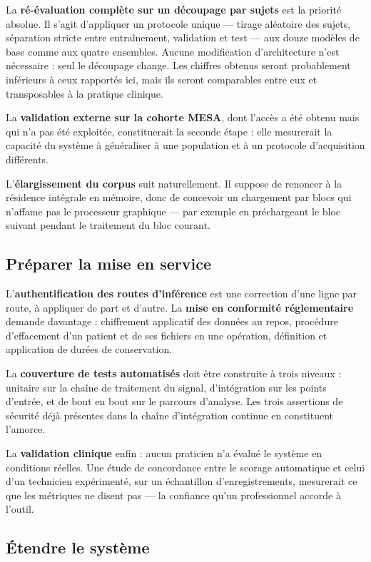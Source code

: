 La \textbf{ré-évaluation complète sur un découpage par sujets} est la priorité absolue.
Il s'agit d'appliquer un protocole unique — tirage aléatoire des sujets, séparation
stricte entre entraînement, validation et test — aux douze modèles de base comme aux
quatre ensembles. Aucune modification d'architecture n'est nécessaire : seul le
découpage change. Les chiffres obtenus seront probablement inférieurs à ceux rapportés
ici, mais ils seront comparables entre eux et transposables à la pratique clinique.

La \textbf{validation externe sur la cohorte MESA}, dont l'accès a été obtenu mais qui
n'a pas été exploitée, constituerait la seconde étape : elle mesurerait la capacité du
système à généraliser à une population et à un protocole d'acquisition différents.

L'\textbf{élargissement du corpus} suit naturellement. Il suppose de renoncer à la
résidence intégrale en mémoire, donc de concevoir un chargement par blocs qui n'affame
pas le processeur graphique — par exemple en préchargeant le bloc suivant pendant le
traitement du bloc courant.

\subsection*{Préparer la mise en service}

L'\textbf{authentification des routes d'inférence} est une correction d'une ligne par
route, à appliquer de part et d'autre. La \textbf{mise en conformité réglementaire}
demande davantage : chiffrement applicatif des données au repos, procédure d'effacement
d'un patient et de ses fichiers en une opération, définition et application de durées de
conservation.

La \textbf{couverture de tests automatisés} doit être construite à trois niveaux :
unitaire sur la chaîne de traitement du signal, d'intégration sur les points d'entrée,
et de bout en bout sur le parcours d'analyse. Les trois assertions de sécurité déjà
présentes dans la chaîne d'intégration continue en constituent l'amorce.

La \textbf{validation clinique} enfin : aucun praticien n'a évalué le système en
conditions réelles. Une étude de concordance entre le scorage automatique et celui d'un
technicien expérimenté, sur un échantillon d'enregistrements, mesurerait ce que les
métriques ne disent pas — la confiance qu'un professionnel accorde à l'outil.

\subsection*{Étendre le système}

